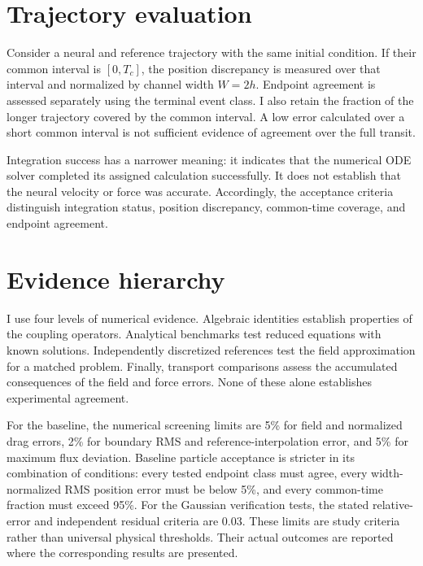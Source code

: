 \section{Trajectory evaluation}
Consider a neural and reference trajectory with the same initial condition.
If their common interval is $[0,T_c]$, the position discrepancy is measured
over that interval and normalized by channel width $W=2h$. Endpoint
agreement is assessed separately using the terminal event class. I also
retain the fraction of the longer trajectory covered by the common
interval. A low error calculated over a short common interval is not
sufficient evidence of agreement over the full transit.

Integration success has a narrower meaning: it indicates that the numerical
ODE solver completed its assigned calculation successfully.
It does not establish that the neural velocity or force was accurate.
Accordingly, the acceptance criteria distinguish integration status,
position discrepancy, common-time coverage, and endpoint agreement.

\section{Evidence hierarchy}
I use four levels of numerical evidence. Algebraic identities establish
properties of the coupling operators. Analytical benchmarks test reduced
equations with known solutions. Independently discretized references test
the field approximation for a matched problem. Finally, transport
comparisons assess the accumulated consequences of the field and force
errors. None of these alone establishes experimental agreement.

For the baseline, the numerical screening limits are 5\% for field and
normalized drag errors, 2\% for boundary RMS and reference-interpolation
error, and 5\% for maximum flux deviation. Baseline particle acceptance is
stricter in its combination of conditions: every tested endpoint class must
agree, every width-normalized RMS position error must be below 5\%, and
every common-time fraction must exceed 95\%. For the Gaussian verification
tests, the stated relative-error and independent residual criteria are
0.03. These limits are study criteria rather than universal physical
thresholds. Their actual outcomes are reported where the corresponding
results are presented.
